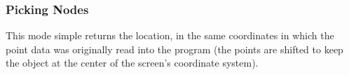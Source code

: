 \subsubsection{Picking Nodes}

This mode simple returns the location, in the same coordinates in which the
point  data was originally read into the program (the points are shifted to
keep the object at the center of the screen's coordinate system).







